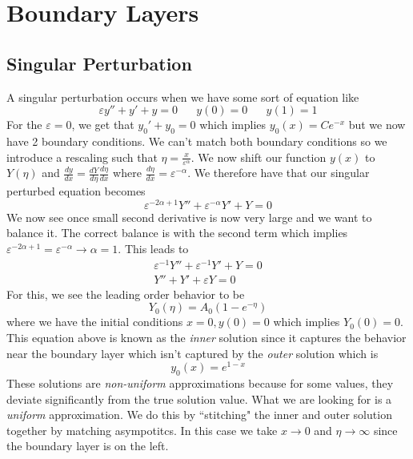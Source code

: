 \documentclass{article}
\newcommand{\od}[2]{\frac{d #1}{d #2}}
\newcommand{\twen}{\hspace{20pt}}
\begin{document}
\section{Boundary Layers}
\subsection{Singular Perturbation}
A singular perturbation occurs when we have some sort of equation like 
\begin{equation*}
    \varepsilon y''+y'+y=0 \twen y(0) =0 \twen y(1)=1
\end{equation*}
For the $\varepsilon=0$, we get that $y_0'+y_0=0$ which implies $y_0(x)=Ce^{-x}$ but we now have 2 boundary conditions. We can't match both boundary conditions so we introduce a rescaling such that $\eta =\frac{x}{\varepsilon^\alpha}$. We now shift our function $y(x)$ to $Y(\eta)$ and $\od{y}{x}=\od{Y}{\eta} \od{\eta}{x}$ where $\od{\eta}{x} = \varepsilon^{-\alpha}$. We therefore have that our singular perturbed equation becomes 
\begin{equation}
    \varepsilon^{-2\alpha +1}Y'' + \varepsilon^{-\alpha}Y'+Y=0
\end{equation}
We now see once small second derivative is now very large and we want to balance it. The correct balance is with the second term which implies $\varepsilon^{-2\alpha +1}=\varepsilon^{-\alpha} \rightarrow \alpha = 1$. This leads to 
\begin{equation*}
    \begin{split}
        \varepsilon^{-1} Y'' +\varepsilon^{-1}Y'+Y=0 \\
        Y''+Y'+\varepsilon Y=0
    \end{split}
\end{equation*}
For this, we see the leading order behavior to be 
\begin{equation*}
    Y_0(\eta) =A_0 (1-e^{-\eta})
\end{equation*}
where we have the initial conditions $x=0, y(0)=0$ which implies $Y_0(0)=0$. This equation above is known as the \emph{inner} solution since it captures the behavior near the boundary layer which isn't captured by the \emph{outer} solution which is 
\begin{equation*}
    y_0(x) = e^{1-x}
\end{equation*}
These solutions are \emph{non-uniform} approximations because for some values, they deviate significantly from the true solution value. What we are looking for is a \emph{uniform} approximation. We do this by ``stitching" the inner and outer solution together by matching asympotitcs. In this case we take $x\rightarrow 0$ and $\eta \to \infty$ since the boundary layer is on the left.
\end{document}
